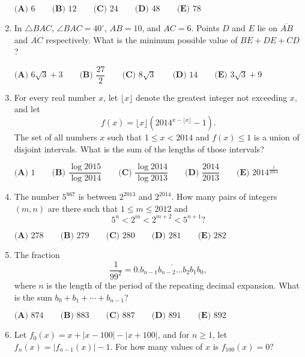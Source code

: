 \documentclass{article}
\begin{document}
\begin{enumerate}[label=\arabic*., itemsep=0.5em]
\(\textbf{(A) }6\qquad
\textbf{(B) }12\qquad
\textbf{(C) }24\qquad
\textbf{(D) }48\qquad
\textbf{(E) }78\qquad\)\par \vspace{0.5em}\item In \(\triangle BAC\), \(\angle BAC=40^\circ\), \(AB=10\), and \(AC=6\).  Points \(D\) and \(E\) lie on \(\overline{AB}\) and \(\overline{AC}\) respectively.  What is the minimum possible value of \(BE+DE+CD\)?

\(\textbf{(A) }6\sqrt 3+3\qquad
\textbf{(B) }\dfrac{27}2\qquad
\textbf{(C) }8\sqrt 3\qquad
\textbf{(D) }14\qquad
\textbf{(E) }3\sqrt 3+9\qquad\)\par \vspace{0.5em}\item For every real number \(x\), let \(\lfloor x\rfloor\) denote the greatest integer not exceeding \(x\), and let 
\begin{equation*}
f(x)=\lfloor x\rfloor(2014^{x-\lfloor x\rfloor}-1).
\end{equation*}
  The set of all numbers \(x\) such that \(1\leq x<2014\) and \(f(x)\leq 1\) is a union of disjoint intervals.  What is the sum of the lengths of those intervals?

\(\textbf{(A) }1\qquad
\textbf{(B) }\dfrac{\log 2015}{\log 2014}\qquad
\textbf{(C) }\dfrac{\log 2014}{\log 2013}\qquad
\textbf{(D) }\dfrac{2014}{2013}\qquad
\textbf{(E) }2014^{\frac1{2014}}\qquad\)\par \vspace{0.5em}\item The number \(5^{867}\) is between \(2^{2013}\) and \(2^{2014}\).  How many pairs of integers \((m,n)\) are there such that \(1\leq m\leq 2012\) and 
\begin{equation*}
5^n<2^m<2^{m+2}<5^{n+1}?
\end{equation*}

\(\textbf{(A) }278\qquad
\textbf{(B) }279\qquad
\textbf{(C) }280\qquad
\textbf{(D) }281\qquad
\textbf{(E) }282\qquad\)\par \vspace{0.5em}\item The fraction 
\begin{equation*}
\dfrac1{99^2}=0.\overline{b_{n-1}b_{n-2}\ldots b_2b_1b_0},
\end{equation*}
 where \(n\) is the length of the period of the repeating decimal expansion.  What is the sum \(b_0+b_1+\cdots+b_{n-1}\)?

\(\textbf{(A) }874\qquad
\textbf{(B) }883\qquad
\textbf{(C) }887\qquad
\textbf{(D) }891\qquad
\textbf{(E) }892\qquad\)\par \vspace{0.5em}\item Let \(f_0(x)=x+|x-100|-|x+100|\), and for \(n\geq 1\), let \(f_n(x)=|f_{n-1}(x)|-1\).  For how many values of \(x\) is \(f_{100}(x)=0\)?


\end{enumerate}
\end{document}
